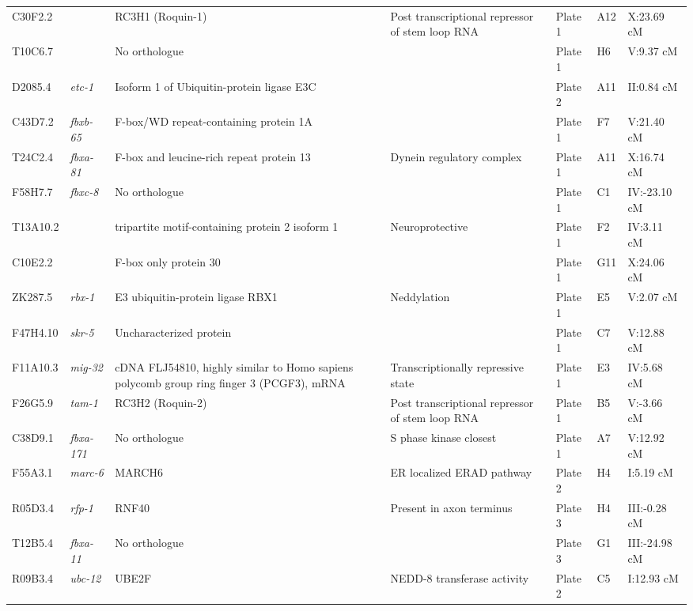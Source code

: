 \begin{table}[!htp]
\begin{tabularx}{1\textwidth}{@{}
			>{\hsize}L
			>{\hsize}L
			>{\hsize}L
			>{\hsize}L
			>{\hsize}L
			>{\hsize}L
			>{\hsize\ttfamily}L
			@{}}
		\\
		C30F2.2 & & RC3H1 (Roquin-1) &Post transcriptional repressor of stem loop RNA &Plate 1 &A12 &X:23.69 cM
		\\
		T10C6.7 & &No orthologue & &Plate 1 &H6 &V:9.37 cM
		\\
		D2085.4 &\textit{etc-1} &Isoform 1 of Ubiquitin-protein ligase E3C & &Plate 2 &A11 &II:0.84 cM
		\\
		C43D7.2 &\textit{fbxb-65} & F-box/WD repeat-containing protein 1A & &Plate 1 &F7 &V:21.40 cM
		\\
		T24C2.4 &\textit{fbxa-81} & F-box and leucine-rich repeat protein 13 &Dynein regulatory complex &Plate 1 &A11 &X:16.74 cM
		\\
		F58H7.7 &\textit{fbxc-8} &No orthologue & &Plate 1 &C1 &IV:-23.10 cM
		\\
		T13A10.2 & &tripartite motif-containing protein 2 isoform 1 &Neuroprotective &Plate 1 &F2 &IV:3.11 cM
		\\
		C10E2.2 & &F-box only protein 30 & &Plate 1 &G11 &X:24.06 cM
		\\
		ZK287.5 &\textit{rbx-1} &E3 ubiquitin-protein ligase RBX1 &Neddylation &Plate 1 &E5 &V:2.07 cM
		\\
		F47H4.10 &\textit{skr-5} &Uncharacterized protein & &Plate 1 &C7 &V:12.88 cM
		\\
		F11A10.3 &\textit{mig-32} &cDNA FLJ54810, highly similar to Homo sapiens polycomb group ring finger 3 (PCGF3), mRNA &Transcriptionally repressive state &Plate 1 &E3 &IV:5.68 cM
		\\
		F26G5.9 &\textit{tam-1} & RC3H2 (Roquin-2) & Post transcriptional repressor of stem loop RNA &Plate 1 &B5 &V:-3.66 cM
		\\
		C38D9.1 &\textit{fbxa-171} &No orthologue &S phase kinase closest &Plate 1 &A7 &V:12.92 cM
		\\
		F55A3.1 &\textit{marc-6} &MARCH6 &ER localized ERAD pathway &Plate 2 &H4 &I:5.19 cM
		\\
		R05D3.4 &\textit{rfp-1} &RNF40 &Present in axon terminus &Plate 3 &H4 &III:-0.28 cM
		\\
		T12B5.4 &\textit{fbxa-11} &No orthologue & &Plate 3 &G1 &III:-24.98 cM
		\\
		R09B3.4 &\textit{ubc-12} &UBE2F &NEDD-8 transferase activity &Plate 2 &C5 &I:12.93 cM
		\\
		\bottomrule
	\end{tabularx}
\end{table}

\newpage

